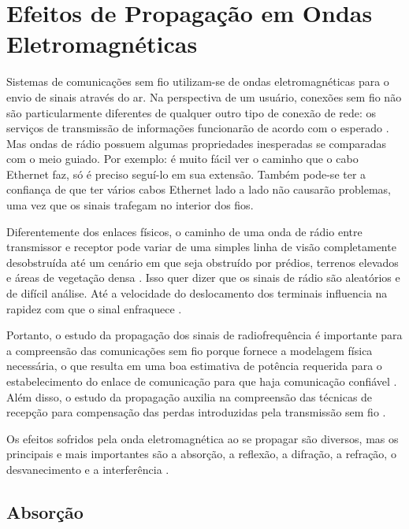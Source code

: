\section{Efeitos de Propagação em Ondas Eletromagnéticas}
\label{sec:efeitos-propagacao-OE}

Sistemas de comunicações sem fio utilizam-se de ondas eletromagnéticas para o envio de sinais através do ar. Na perspectiva de um usuário, conexões sem fio não são particularmente diferentes de qualquer outro tipo de conexão de rede: os serviços de transmissão de informações funcionarão de acordo com o esperado \cite{flickenger2008}. Mas ondas de rádio possuem algumas propriedades inesperadas se comparadas com o meio guiado.  Por exemplo: é muito fácil ver o caminho que o cabo Ethernet faz, só é preciso seguí-lo em sua extensão. Também pode-se ter a confiança de que ter vários cabos Ethernet lado a lado não causarão problemas, uma vez que os sinais trafegam no interior dos fios.

Diferentemente dos enlaces físicos, o caminho de uma onda de rádio entre transmissor e receptor pode variar de uma simples linha de visão completamente desobstruída até um cenário em que seja obstruído por prédios, terrenos elevados e áreas de vegetação densa \cite{rappaport2009}. Isso quer dizer que os sinais de rádio são aleatórios e de difícil análise. Até a velocidade do deslocamento dos terminais influencia na rapidez com que o sinal enfraquece \cite{rappaport2009}.

Portanto, o estudo da propagação dos sinais de radiofrequência é importante para a compreensão das comunicações sem fio porque fornece a modelagem física necessária, o que resulta em uma boa estimativa de potência requerida para o estabelecimento do enlace de comunicação para que haja comunicação confiável \cite{haykin2008}. Além disso, o estudo da propagação auxilia na compreensão das técnicas de recepção para compensação das perdas introduzidas pela transmissão sem fio \cite{haykin2008}.

Os efeitos sofridos pela onda eletromagnética ao se propagar são diversos, mas os principais e mais importantes são a absorção, a reflexão, a difração, a refração, o desvanecimento e a interferência \cite{flickenger2008,haykin2008,rappaport2009}.

\subsection{Absorção}
\label{sub:absorcao}

